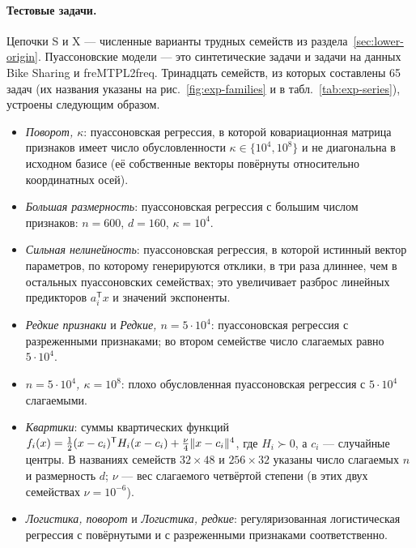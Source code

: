 \paragraph{Тестовые задачи.}
Цепочки S и X --- численные варианты трудных семейств из
раздела~\ref{sec:lower-origin}. Пуассоновские модели --- это синтетические задачи
и задачи на данных Bike Sharing и freMTPL2freq. Тринадцать семейств,
из которых составлены 65 задач (их названия указаны на рис.~\ref{fig:exp-families}
и в табл.~\ref{tab:exp-series}), устроены следующим образом.
\begin{itemize}
\item \emph{Поворот, $\kappa$}: пуассоновская регрессия, в которой
ковариационная матрица признаков имеет число обусловленности
$\kappa\in\{10^4,10^8\}$ и не диагональна в исходном базисе (её собственные
векторы повёрнуты относительно координатных осей).
\item \emph{Большая размерность}: пуассоновская регрессия с большим числом
признаков: $n=600$, $d=160$, $\kappa=10^4$.
\item \emph{Сильная нелинейность}: пуассоновская регрессия, в которой
истинный вектор параметров, по которому генерируются отклики, в три раза
длиннее, чем в остальных пуассоновских семействах; это увеличивает разброс
линейных предикторов $a_i^{\mathsf T}x$ и значений экспоненты.
\item \emph{Редкие признаки} и \emph{Редкие, $n=5\cdot10^4$}: пуассоновская
регрессия с разреженными признаками; во втором семействе число слагаемых
равно $5\cdot10^4$.
\item \emph{$n=5\cdot10^4$, $\kappa=10^8$}: плохо обусловленная
пуассоновская регрессия с $5\cdot10^4$ слагаемыми.
\item \emph{Квартики}: суммы квартических функций
$f_i(x)=\frac12(x-c_i)^{\mathsf T}H_i(x-c_i)+\frac\nu4\lVert x-c_i\rVert^4$,
где $H_i\succ0$, а $c_i$ --- случайные центры. В названиях семейств
$32\times48$ и $256\times32$ указаны число слагаемых $n$ и размерность $d$;
$\nu$ --- вес слагаемого четвёртой степени (в этих двух семействах
$\nu=10^{-6}$).
\item \emph{Логистика, поворот} и \emph{Логистика, редкие}: регуляризованная
логистическая регрессия с повёрнутыми и с разреженными признаками
соответственно.
\end{itemize}
\FloatBarrier
